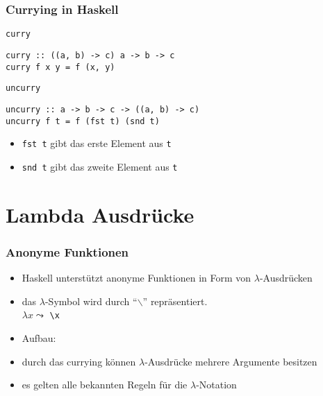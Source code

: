 \begin{frame}[fragile]
\frametitle{Currying in Haskell}
\begin{block}{\lstinline|curry|}
\begin{lstlisting}
curry :: ((a, b) -> c) a -> b -> c
curry f x y = f (x, y)
\end{lstlisting}
\end{block}
\pause
\begin{block}{\lstinline|uncurry|}
\begin{lstlisting}
uncurry :: a -> b -> c -> ((a, b) -> c)
uncurry f t = f (fst t) (snd t)
\end{lstlisting}
\end{block}
\pause
\vspace*{-3ex}
\begin{block}{\vspace*{-3ex}}
\begin{itemize}
  \item \lstinline|fst t| gibt das erste Element aus \lstinline|t|
  \item \lstinline|snd t| gibt das zweite Element aus \lstinline|t|
\end{itemize}
\end{block}
\end{frame}

\section{Lambda Ausdrücke}
\begin{frame}
\frametitle{Anonyme Funktionen}
\begin{block}{\vspace*{-3ex}}
\begin{itemize}
  \item Haskell unterstützt anonyme Funktionen in Form von $\lambda$-Ausdrücken
  \item das $\lambda$-Symbol wird durch "`$\backslash$"' repräsentiert.\\ $\lambda x \leadsto$ \lstinline|\x|
  \item Aufbau: \\
  \item durch das currying können $\lambda$-Ausdrücke mehrere Argumente besitzen
  \item es gelten alle bekannten Regeln für die $\lambda$-Notation
\end{itemize}
\begin{center}
\scalebox{0.8}{}
\end{center}
\end{block}
\end{frame}

